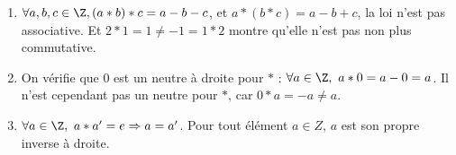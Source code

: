 \begin{enumerate}[label=\alph*)]
    \item $\forall a,b,c \in \Z, (a \ast b) \ast c = a - b - c $, et  $ a \ast (b \ast c) = a - b + c $, la loi n'est pas associative. Et $2 \ast 1 = 1 \neq -1 = 1 \ast 2$ montre qu'elle n'est pas non plus commutative.
    \item On vérifie que $0$ est un neutre à droite pour $\ast$ : $\forall a \in \Z,\ a \ast 0 = a - 0 = a$. Il n'est cependant pas un neutre pour $\ast$, car $0 \ast a = -a \neq a$.
    \item $\forall a \in \Z,\ a \ast a' = e \Rightarrow a = a'$. Pour tout élément $a \in Z$, $a$ est son propre inverse à droite.
\end{enumerate}